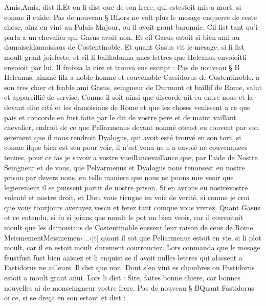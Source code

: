 \documentclass{article}
\begin{document}
\begin{pages}
      Amis,Amis, dist il,Et on li dist que de son frere, 
      qui estestoit mis a mort, si conme il cuide. \pend
\pstart Pas de nouveau § BLors ne volt plus 
   le mesage enquerre de ceste chose, 
   ainz en vint au Palais Majour, ou il avoit grant baronnie. 
   Cil fist tant qu’i parla a un chevalier qui Gasus avoit non. 
   Et cil Gasus estoit si bien ami au 
   damoiseldamoisiaus de 
   Costentinoble. Et quant Gasus vit 
   le mesage, si li fist moult grant 
   joiefeste, et cil li 
   bailladonna unes lettres que Helcanus 
   envoioitli envoioit par lui. 
   Il froissa la cire et trouva ens escript : \pend
\pstart Pas de nouveau § B
   Helcanus, 
   ainzné filz a noble honme et couvenable 
   Cassidorus de Costentinoble, 
   a son tres chier et feable ami Gasus, 
   seingneur de Durmont et baillif de Rome, 
   salut et appareillié de servise. Conme il soit ainsi que discorde ait eu entre nous 
   et la devant dite cité et les damoisiaus de 
   Rome et que les choses venissent a ce que pais et concorde 
   en fust faite par 
   le dit de vostre pere et de maint vaillant chevalier, 
   endroit de ce que Peliarmenus 
   devant nonmé oteust eu couvent par son serement
   que il nous rendroit Dyalogus, 
   qui avoit esté trouvé en son tort, si conme ilque bien est seu 
   pour voir, il n’est venu ne n’a envoié ne couvenances 
   tenues, pour ce fas je savoir a vostre 
   vueillancevaillance que, par l’aide de Nostre Seingneur et de vous, 
   que Pelyarmenus et Dyalogus 
   nous tenonsest en nostre prison par devers nous, 
   en telle maniere que nous ne poons mie veoir que legierement il se puissent partir de nostre prison. 
   Si en avrons eu nostrevostre volenté et nostre droit, et Dieu vous tiengne en 
   voie de verité, si conme je croi que vous touzjours avezayez vescu 
   et ferez tant comque vous vivrez. \pend
\pstart Quant Gasus ot ce entendu, si fu si joians que moult le pot 
   on bien veoir, car il couvoitoit moult que les damoisiaus de Costentinoble eussent 
   leur raison de ceus de Rome. MeismementMeismemen‹...›[t]
   quant il sot que Peliarmenus estoit en vie, si li plot moult, 
   car il en estoit moult durement courrouciez. Lors conmanda que 
   le mesage 
      feustfust fust bien aaisiez et li enquist 
   se il avoit nulles lettres qui alassent a Fastidorus ne ailleurs.
   Il dist que non. Dont s’en vint es chambres ou 
   Fastidorus estoit a moult grant anui. Lors li dist :
   Sire, faites bonne chiere, car bonnes nouvelles ai de monseingneur vostre frere. \pend
\pstart Pas de nouveau § BQuant Fastidorus oï ce, 
   si se dreça en son estant et dist :

\end{pages}
\end{document}
